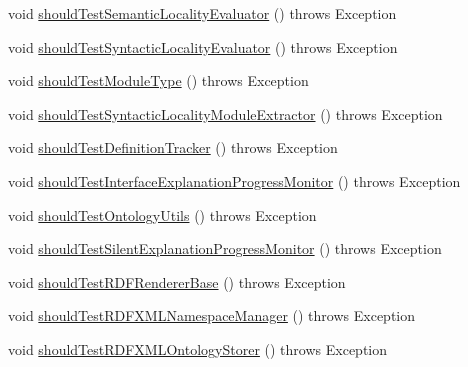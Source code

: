 \begin{DoxyCompactItemize}
\item 
void \hyperlink{classorg_1_1semanticweb_1_1owlapi_1_1contract_1_1_contract_smalls_test_a644a282eae3dc3980f65602fc72f4999}{should\-Test\-Semantic\-Locality\-Evaluator} ()  throws Exception 
\item 
void \hyperlink{classorg_1_1semanticweb_1_1owlapi_1_1contract_1_1_contract_smalls_test_a499f6216f0d25f79e4831f794a847d06}{should\-Test\-Syntactic\-Locality\-Evaluator} ()  throws Exception 
\item 
void \hyperlink{classorg_1_1semanticweb_1_1owlapi_1_1contract_1_1_contract_smalls_test_a1d2435bd1a1237e019d58b8ffed0d822}{should\-Test\-Module\-Type} ()  throws Exception 
\item 
void \hyperlink{classorg_1_1semanticweb_1_1owlapi_1_1contract_1_1_contract_smalls_test_a81a53e798385b454b6a692fcdc7d7103}{should\-Test\-Syntactic\-Locality\-Module\-Extractor} ()  throws Exception 
\item 
void \hyperlink{classorg_1_1semanticweb_1_1owlapi_1_1contract_1_1_contract_smalls_test_acba1c7cca248aa376bc2b09a32112c0c}{should\-Test\-Definition\-Tracker} ()  throws Exception 
\item 
void \hyperlink{classorg_1_1semanticweb_1_1owlapi_1_1contract_1_1_contract_smalls_test_a2a30f704b5d62d01a937254dd7c92c9c}{should\-Test\-Interface\-Explanation\-Progress\-Monitor} ()  throws Exception 
\item 
void \hyperlink{classorg_1_1semanticweb_1_1owlapi_1_1contract_1_1_contract_smalls_test_a0fd100eee91be8198f96413689b21983}{should\-Test\-Ontology\-Utils} ()  throws Exception 
\item 
void \hyperlink{classorg_1_1semanticweb_1_1owlapi_1_1contract_1_1_contract_smalls_test_a2305a27c25ed68cd9704618da92960da}{should\-Test\-Silent\-Explanation\-Progress\-Monitor} ()  throws Exception 
\item 
void \hyperlink{classorg_1_1semanticweb_1_1owlapi_1_1contract_1_1_contract_smalls_test_a0aa8a45c2b9d89e5e22b7c1755feb701}{should\-Test\-R\-D\-F\-Renderer\-Base} ()  throws Exception 
\item 
void \hyperlink{classorg_1_1semanticweb_1_1owlapi_1_1contract_1_1_contract_smalls_test_ad158730d2b807b442a8116a82f049f84}{should\-Test\-R\-D\-F\-X\-M\-L\-Namespace\-Manager} ()  throws Exception 
\item 
void \hyperlink{classorg_1_1semanticweb_1_1owlapi_1_1contract_1_1_contract_smalls_test_a02582542d528c664c66f07ddef41fa81}{should\-Test\-R\-D\-F\-X\-M\-L\-Ontology\-Storer} ()  throws Exception 
\item 

\end{DoxyCompactItemize}
